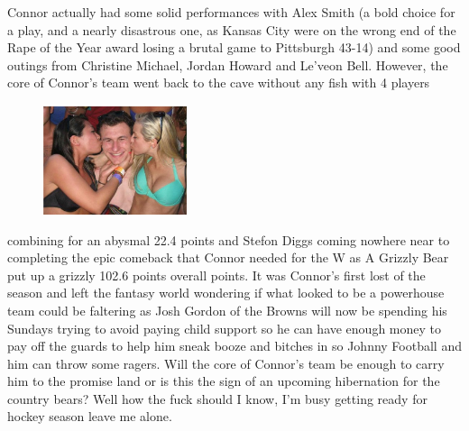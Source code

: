 \documentclass[11pt,letterpaper]{article}
\begin{document}
\bigskip
\par\noindent Connor actually had some solid performances with Alex Smith (a bold choice for a play, and a nearly disastrous one, as Kansas City were on the wrong end of the Rape of the Year award losing a brutal game to Pittsburgh 43-14) and some good outings from Christine Michael, Jordan Howard and Le'veon Bell. However, the core of Connor's team went back to the cave without any fish with 4 players 
\begin{figure}
\centering
\includegraphics[width=0.375\textwidth]{week4-manziel.png}
\label{fig:week4-manziel}
\end{figure} 
\par\noindent combining for an abysmal 22.4 points and Stefon Diggs coming nowhere near to completing the epic comeback that Connor needed for the W as A Grizzly Bear put up a grizzly 102.6 points overall points. It was Connor's first lost of the season and left the fantasy world wondering if what looked to be a powerhouse team could be faltering as Josh Gordon of the Browns will now be spending his Sundays trying to avoid paying child support so he can have enough money to pay off the guards to help him sneak booze and bitches in so Johnny Football and him can throw some ragers. Will the core of Connor's team be enough to carry him to the promise land or is this the sign of an upcoming hibernation for the country bears? Well how the fuck should I know, I'm busy getting ready for hockey season leave me alone.
\end{document}
